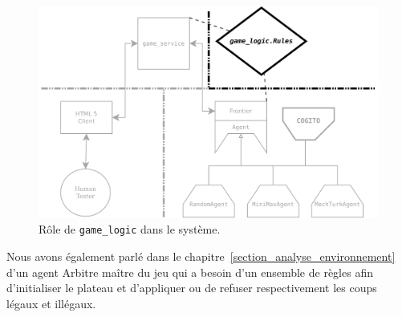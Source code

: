 \begin{figure}[H] 
\centering
\includegraphics[width=\textwidth]{files/william/archi_lib} 
\caption{Rôle de \texttt{\gls{game_logic}} dans le système.} 
\end{figure}

Nous avons également parlé dans le chapitre~\ref{section_analyse_environnement} d'un agent \og Arbitre \fg{} maître du jeu qui a besoin d'un ensemble de règles afin d'initialiser le plateau et d'appliquer ou de refuser respectivement les coups légaux et illégaux.

